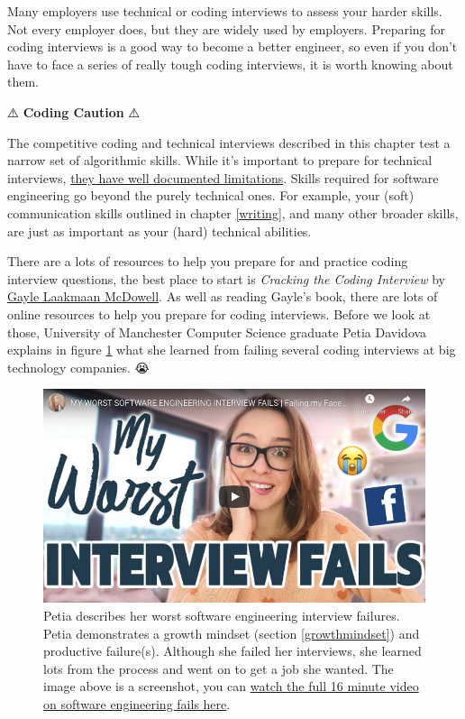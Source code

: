 \documentclass[
]{book}
\begin{document}
Many employers use technical or coding interviews to assess your harder skills. Not every employer does, but they are widely used by employers. Preparing for coding interviews is a good way to become a better engineer, so even if you don't have to face a series of really tough coding interviews, it is worth knowing about them.

⚠️ \textbf{Coding Caution} ⚠️

The competitive coding and technical interviews described in this chapter test a narrow set of algorithmic skills. While it's important to prepare for technical interviews, \href{https://www.quora.com/What-are-some-common-criticisms-of-Cracking-the-Coding-interview}{they have well documented limitations}. \citep{murashenkov} Skills required for software engineering go beyond the purely technical ones. For example, your (soft) communication skills outlined in chapter \ref{writing}, and many other broader skills, are just as important as your (hard) technical abilities.

There are a lots of resources to help you prepare for and practice coding interview questions, the best place to start is \emph{Cracking the Coding Interview} by \href{https://en.wikipedia.org/wiki/Gayle_Laakmann_McDowell}{Gayle Laakmaan McDowell}. \citep{cracking} As well as reading Gayle's book, there are lots of online resources to help you prepare for coding interviews. Before we look at those, University of Manchester Computer Science graduate Petia Davidova explains in figure \ref{fig:petia-fig} what she learned from failing several coding interviews at big technology companies. 😭

\begin{figure}

{\centering \includegraphics[width=0.99\linewidth]{images/youtube-petia} 

}

\caption{Petia describes her worst software engineering interview failures. \citep{youtube-petia} Petia demonstrates a growth mindset (section \ref{growthmindset}) and productive failure(s). Although she failed her interviews, she learned lots from the process and went on to get a job she wanted. The image above is a screenshot, you can \href{https://www.youtube.com/watch?v=qkeQNNjZuQk}{watch the full 16 minute video on software engineering fails here}.}\label{fig:petia-fig}
\end{figure}
\end{document}
